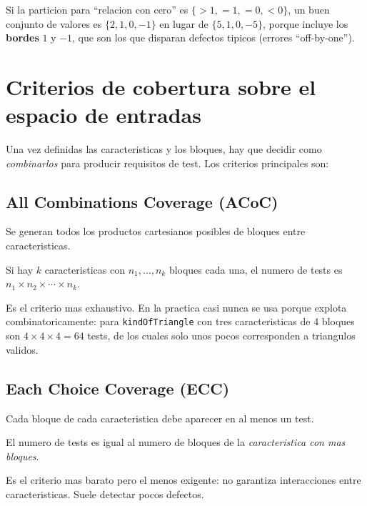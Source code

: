 \documentclass[12pt,a4paper]{article}
\begin{document}
\begin{ejemplobox}
Si la particion para ``relacion con cero'' es \(\{>1, =1, =0, <0\}\), un buen conjunto de valores
es \(\{2, 1, 0, -1\}\) en lugar de \(\{5, 1, 0, -5\}\), porque incluye los \textbf{bordes}
\(1\) y \(-1\), que son los que disparan defectos tipicos (errores ``off-by-one'').
\end{ejemplobox}

\section{Criterios de cobertura sobre el espacio de entradas}

Una vez definidas las caracteristicas y los bloques, hay que decidir como \emph{combinarlos} para
producir requisitos de test. Los criterios principales son:

\subsection{All Combinations Coverage (ACoC)}

\begin{definicionbox}
Se generan todos los productos cartesianos posibles de bloques entre caracteristicas.

Si hay \(k\) caracteristicas con \(n_1, \ldots, n_k\) bloques cada una, el numero de tests es
\(n_1 \times n_2 \times \cdots \times n_k\).
\end{definicionbox}

Es el criterio mas exhaustivo. En la practica casi nunca se usa porque explota combinatoricamente:
para \texttt{kindOfTriangle} con tres caracteristicas de 4 bloques son \(4 \times 4 \times 4 = 64\)
tests, de los cuales solo unos pocos corresponden a triangulos validos.

\subsection{Each Choice Coverage (ECC)}

\begin{definicionbox}
Cada bloque de cada caracteristica debe aparecer en al menos un test.

El numero de tests es igual al numero de bloques de la \emph{caracteristica con mas bloques}.
\end{definicionbox}

Es el criterio mas barato pero el menos exigente: no garantiza interacciones entre caracteristicas.
Suele detectar pocos defectos.
\end{document}
